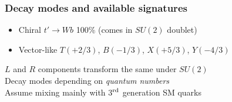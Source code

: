 \begin{frame}\frametitle{Decay modes and available signatures}
\centering
\scriptsize

\begin{minipage}{.65\textwidth}\centering
\begin{itemize}
\item Chiral $t'\to Wb$ 100\% (comes in $SU(2)$ doublet)
\item Vector-like $T(+2/3)$, $B(-1/3)$, $X(+5/3)$, $Y(-4/3)$ 
\end{itemize}
$L$ and $R$ components transform the same under $SU(2)$\\
Decay modes depending on {\it quantum numbers}\\ 
Assume mixing mainly with 3$^{\rm rd}$ generation SM quarks

\myskip

  

\end{minipage}

\end{frame}

